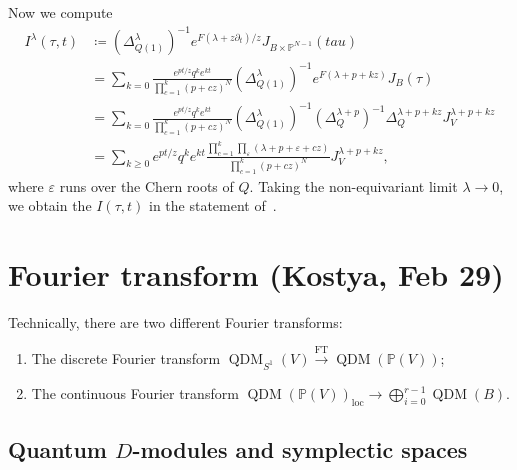 \documentclass[leqno, openany]{memoir}
\theoremstyle{definition}
\theoremstyle{remark}
\theoremstyle{plain}
\theoremstyle{definition}
\theoremstyle{remark}
\renewcommand{\P}{\mathbb{P}}
\newcommand{\ep}{\varepsilon}
\newcommand{\mr}[1]{\mathrm{#1}}
\newcommand{\on}[1]{\operatorname{#1}}
\DeclareMathOperator{\QDM}{QDM}
\begin{document}
Now we compute
\begin{align*} 
    I^{\lambda}(\tau, t) &\coloneqq (\Delta_{Q(1)}^{\lambda})^{-1} e^{F(\lambda + z \partial_t)/z} J_{B \times \P^{N-1}}(tau) \\
    &= \sum_{k=0} \frac{e^{pt/z} q^k e^{kt}}{\prod_{c=1}^k (p+cz)^N} (\Delta_{Q(1)}^{\lambda})^{-1} e^{F(\lambda + p + kz)} J_B(\tau) \\
    &=\sum_{k=0} \frac{e^{pt/z} q^k e^{kt}}{\prod_{c=1}^k (p+cz)^N} (\Delta_{Q(1)}^{\lambda})^{-1} (\Delta_Q^{\lambda + p})^{-1} \Delta_Q^{\lambda+p+kz} J_V^{\lambda + p + kz} \\
    &= \sum_{k \geq 0}e^{pt/z}q^k e^{kt} \frac{\prod_{c=1}^k \prod_{\ep}(\lambda + p + \ep + cz)}{\prod_{c=1}^k (p+cz)^N} J_V^{\lambda + p + kz},
\end{align*}
where $\ep$ runs over the Chern roots of $Q$. Taking the non-equivariant limit $\lambda \to 0$, we obtain the $I(\tau, t)$ in the statement of~.

\section{Fourier transform (Kostya, Feb 29)}%
\label{sec:Fourier transform Kostya Feb 29}

Technically, there are two different Fourier transforms:
\begin{enumerate}
    \item The discrete Fourier transform $\on{QDM}_{S^1}(V) \xrightarrow{\mr{FT}} \on{QDM}(\P(V))$;
    \item The continuous Fourier transform $\QDM(\P(V))_{\mr{loc}} \to \bigoplus_{i=0}^{r-1} \QDM(B)$.
\end{enumerate}

\subsection{Quantum $D$-modules and symplectic spaces}%
\label{sub:Quantum D modules and symplectic spaces}
\end{document}
